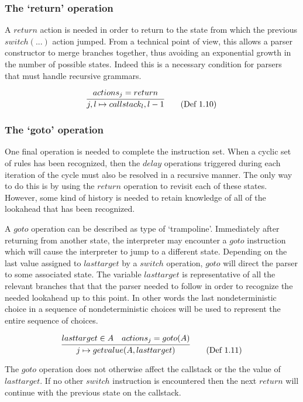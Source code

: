 \documentclass[a4paper,11pt]{article}
\begin{document}
\subsubsection{The `return' operation}
A $return$ action is needed in order to return to the state from which the previous $switch(...)$ action jumped. 
From a technical point of view, this allows a parser constructor to merge branches together, thus avoiding an exponential growth in the number of possible states. 
Indeed this is a necessary condition for parsers that must handle recursive grammars.

\begin{equation}
\infer{j, l \mapsto callstack_l, l-1}{actions_j = return} \tag{Def 1.10}
\end{equation}

\subsubsection{The `goto' operation}
One final operation is needed to complete the instruction set.
When a cyclic set of rules has been recognized, then the $delay$ operations triggered during each iteration of the cycle must also be resolved in a recursive manner.
The only way to do this is by using the $return$ operation to revisit each of these states.
However, some kind of history is needed to retain knowledge of all of the lookahead that has been recognized.

A $goto$ operation can be described as type of `trampoline'. 
Immediately after returning from another state, the interpreter may encounter a $goto$ instruction which will cause the interpreter to jump to a different state.
Depending on the last value assigned to $lasttarget$ by a $switch$ operation, $goto$ will direct the parser to some associated state. 
The variable $lasttarget$ is representative of all the relevant branches that that the parser needed to follow in order to recognize the needed lookahead up to this point.
In other words the last nondeterministic choice in a sequence of nondeterministic choices will be used to represent the entire sequence of choices.

\begin{equation}
\infer{j \mapsto getvalue(A, lasttarget)}{lasttarget \in A & actions_j = goto(A)} \tag{Def 1.11}
\end{equation}

The $goto$ operation does not otherwise affect the callstack or the the value of $lasttarget$. 
If no other $switch$ instruction is encountered then the next $return$ will continue with the previous state on the callstack.
\end{document}
